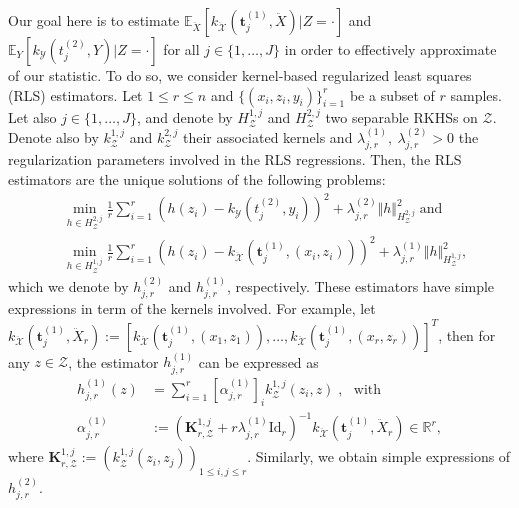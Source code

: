 Our goal here is to estimate $\mathbb{E}_{\ddot{X}}\left[k_{\mathcal{\ddot{X}}}(\mathbf{t}^{(1)}_j,\ddot{X})|Z=\cdot\right]$ and $\mathbb{E}_{Y}\left[k_{\mathcal{Y}}(t^{(2)}_j,Y)|Z=\cdot\right]$ for all $j\in\{1,\dots,J\}$ in order to effectively approximate of our statistic. To do so, we consider kernel-based regularized least squares (RLS) estimators. Let $1 \leq r\leq n$ and $\{(x_i,z_i,y_i)\}_{i=1}^r$ be a subset of $r$ samples. Let also $j\in\{1,\dots,J\}$, and denote by $H_{\mathcal{Z}}^{1,j}$ and $H_{\mathcal{Z}}^{2,j}$ two separable RKHSs on $\mathcal{Z}$. Denote also by $k_{\mathcal{Z}}^{1,j}$ and $k_{\mathcal{Z}}^{2,j}$ their associated kernels and $\lambda^{(1)}_{j,r},~ \lambda^{(2)}_{j,r}>0$ the regularization parameters involved in the RLS regressions. Then, the RLS estimators are the unique solutions of the following problems:
\begin{align*}
 &\min_{h\in H_{\mathcal{Z}}^{2,j}}\frac{1}{r}\sum_{i=1}^r \left(h(z_i) -  k_{\mathcal{Y}}(t^{(2)}_j,y_i)\right)^2 +\lambda^{(2)}_{j,r}\Vert h\Vert_{H_{\mathcal{Z}}^{2,j}}^2\; \text{and}\\
    &\min_{h\in H_{\mathcal{Z}}^{1,j}}\frac{1}{r} \sum_{i=1}^r\left(h(z_i) -  k_{\mathcal{\ddot{X}}}(\mathbf{t}^{(1)}_j,(x_i,z_i))\right)^2 +\lambda^{(1)}_{j,r}\Vert h\Vert_{H_{\mathcal{Z}}^{1,j}}^2,
\end{align*}
which we denote by $h^{(2)}_{j,r}$ and $h^{(1)}_{j,r}$, respectively. These estimators have simple expressions in term of the kernels involved. For example, let $k_{\mathcal{\ddot{X}}}(\mathbf{t}^{(1)}_j,\ddot{X}_r):=[k_{\mathcal{\ddot{X}}}(\mathbf{t}^{(1)}_j,(x_1,z_1)),\dots,k_{\mathcal{\ddot{X}}}(\mathbf{t}^{(1)}_j,(x_r,z_r))]^T$, then for any $z\in\mathcal{Z}$, the estimator  $h^{(1)}_{j,r}$ can be expressed as
\begin{align*}
h^{(1)}_{j,r}(z)&=\sum_{i=1}^r [\alpha^{(1)}_{j,r}]_i k^{1,j}_{\mathcal{Z}}(z_i,z)\; , \text{~~with}\\
\alpha^{(1)}_{j,r}&:= (\mathbf{K}^{1,j}_{r,\mathcal{Z}}+r\lambda^{(1)}_{j,r}\text{Id}_r)^{-1} k_{\mathcal{\ddot{X}}}(\mathbf{t}^{(1)}_j,\ddot{X}_r)\in\mathbb{R}^{r}, 
\end{align*}
where $\mathbf{K}^{1,j}_{r,\mathcal{Z}}:=(k^{1,j}_{\mathcal{Z}}(z_i,z_j))_{1\leq i,j\leq r}$. Similarly, we obtain simple expressions of $h^{(2)}_{j,r}$.
